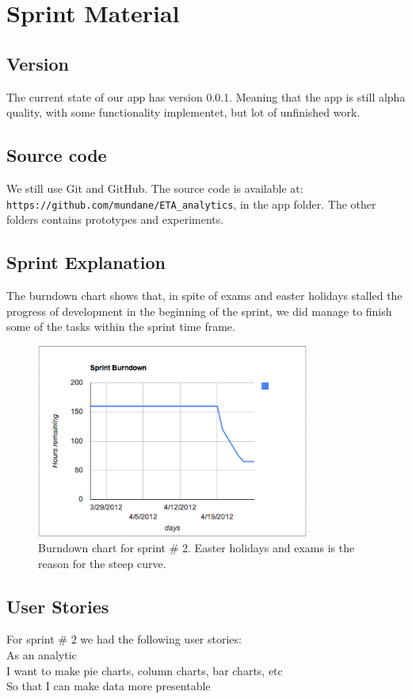 \section{Sprint Material} %
\label{sec:Sprint Material}
\subsection{Version} %
\label{sub:Version}
The current state of our app has version 0.0.1. Meaning that the app is still alpha quality, with some functionality implementet, but lot of unfinished work.
\subsection{Source code} %
\label{sub:Source code}
We still use Git and GitHub. The source code is available at: \verb!https://github.com/mundane/ETA_analytics!, in the app folder. The other folders contains prototypes and experiments.
\subsection{Sprint Explanation}
The burndown chart shows that, in spite of exams and easter holidays stalled the progress of development in the beginning of the sprint, we did manage to finish some of the tasks within the sprint time frame.
\begin{figure}[h!]
  \centering
    \includegraphics[width=0.8\textwidth]{images/burndown.png}
	\caption{Burndown chart for sprint \# 2. Easter holidays and exams is the reason for the steep curve.}
\end{figure}

\subsection{User Stories}
For sprint \# 2 we had the following user stories: \\
As an analytic \\
I want to make pie charts, column charts, bar charts, etc \\
So that I can make data more presentable \\

